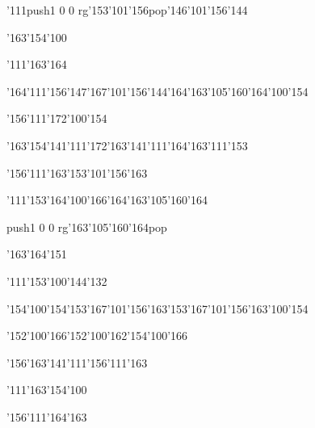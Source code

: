 \null\vfill\ipa\centerline{\enskip\enskip\enskip\enskip\enskip\enskip\enskip\enskip\enskip\enskip\enskip\enskip\enskip}\medskip\centerline{\enskip\char'111\enskip\pdfcolorstack\match push{1 0 0 rg}\char'153\char'101\char'156\pdfcolorstack\match pop{}\enskip\char'146\char'101\char'156\char'144\enskip\enskip\enskip}\medskip\centerline{\enskip\enskip\enskip\char'163\char'154\char'100\enskip\enskip\enskip\enskip\enskip\enskip}\medskip\centerline{\enskip\enskip\enskip\enskip\char'111\char'163\char'164\enskip\enskip\enskip\enskip\enskip\enskip\enskip}\medskip\centerline{\enskip\char'164\char'111\char'156\enskip\char'147\char'167\char'101\char'156\char'144\enskip\char'164\char'163\char'105\char'160\char'164\enskip\char'100\char'154}\medskip\centerline{\enskip\enskip\enskip\char'156\char'111\char'172\enskip\enskip\enskip\enskip\enskip\enskip\enskip\enskip\enskip\char'100\char'154}\medskip\centerline{\enskip\char'163\char'154\char'141\char'111\char'172\enskip\enskip\enskip\enskip\char'163\char'141\char'111\char'164\char'163\enskip\char'111\char'153}\medskip\centerline{\enskip\enskip\enskip\enskip\enskip\enskip\enskip\enskip\enskip\enskip\enskip\enskip}\medskip\centerline{\enskip\enskip\enskip\enskip\enskip\enskip\enskip\char'156\char'111\char'163\enskip\char'153\char'101\char'156\char'163}\medskip\vfill\footline{\hfil\tt\folio\hfil}\eject
\null\vfill\ipa\centerline{\enskip\char'111\char'153\enskip\char'164\char'100\char'166\enskip\char'164\char'163\char'105\char'160\char'164}\medskip\centerline{\enskip\enskip\enskip\enskip\enskip\enskip\enskip\pdfcolorstack\match push{1 0 0 rg}\char'163\char'105\char'160\char'164\pdfcolorstack\match pop{}\enskip\enskip\enskip}\medskip\centerline{\enskip\enskip\enskip\char'163\char'164\char'151\enskip\enskip\enskip\enskip\enskip\enskip}\medskip\centerline{\enskip\char'111\char'153\enskip\char'100\char'144\char'132\enskip\enskip\enskip\enskip\enskip\enskip\enskip}\medskip\centerline{\enskip\char'154\char'100\char'154\enskip\char'153\char'167\char'101\char'156\char'163\enskip\char'153\char'167\char'101\char'156\char'163\enskip\char'100\char'154}\medskip\centerline{\enskip\enskip\enskip\char'152\char'100\char'166\enskip\char'152\char'100\char'162\enskip\char'154\char'100\char'166\enskip\enskip\enskip}\medskip\centerline{\enskip\char'156\char'163\char'141\char'111\char'156\enskip\char'111\char'163\enskip\enskip\enskip\enskip\enskip\enskip\enskip\enskip\enskip}\medskip\centerline{\enskip\char'111\enskip\char'163\char'154\char'100\enskip\enskip\enskip\enskip\enskip\enskip}\medskip\centerline{\enskip\enskip\enskip\enskip\enskip\enskip\enskip\enskip\enskip\enskip\enskip\char'156\char'111\char'164\char'163}\medskip\vfill\footline{\hfil\tt\folio\hfil}\eject

